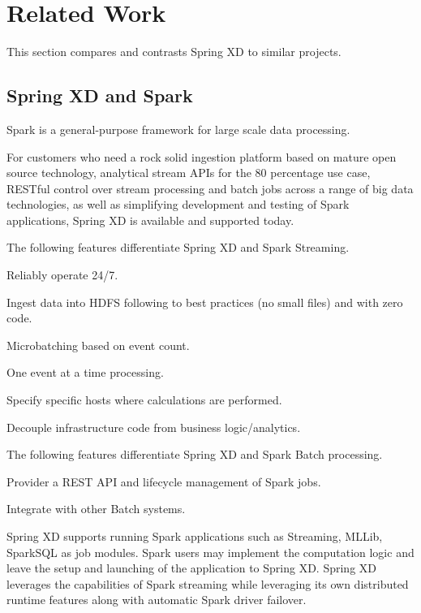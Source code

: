\section{Related Work}
This section compares and contrasts Spring XD to similar projects.

\subsection{Spring XD and Spark}
Spark is a general-purpose framework for large scale data processing.

For customers who need a rock solid ingestion platform based on mature open source technology, analytical stream APIs for the 80 percentage use case, RESTful control over stream processing and batch jobs across a range of big data technologies, as well as simplifying development and testing of Spark applications, Spring XD is available and supported today.

The following features differentiate Spring XD and Spark Streaming.

\begin{itemize*}
\item Reliably operate 24/7.
\item Ingest data into HDFS following to best practices (no small files) and with zero code.
\item Microbatching based on event count.
\item One event at a time processing.
\item Specify specific hosts where calculations are performed.
\item Decouple infrastructure code from business logic\slash analytics.
\end{itemize*}

The following features differentiate Spring XD and Spark Batch processing.

\begin{itemize*}
\item Provider a REST API and lifecycle management of Spark jobs.
\item Integrate with other Batch systems.
\end{itemize*}

Spring XD supports running Spark applications such as Streaming, MLLib, SparkSQL as job modules.
Spark users may implement the computation logic and leave the setup and launching of the
application to Spring XD. Spring XD leverages the capabilities of Spark streaming while
leveraging its own distributed runtime features along with automatic Spark driver failover.

